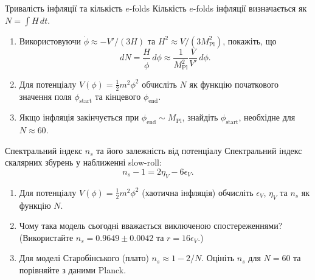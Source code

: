 \begin{problem}{Тривалість інфляції та кількість $e$-folds}
Кількість $e$-folds інфляції визначається як $N = \int H\,dt$.

\begin{enumerate}
    \item Використовуючи $\dot{\phi} \approx -V'/(3H)$ та $H^2 \approx V/(3M_{\mathrm{Pl}}^2)$,
          покажіть, що
          \[
          dN = \frac{H}{\dot{\phi}}\,d\phi \approx \frac{1}{M_{\mathrm{Pl}}^2}\frac{V}{V'}\,d\phi.
          \]
    \item Для потенціалу $V(\phi) = \frac{1}{2}m^2\phi^2$ обчисліть $N$ як функцію
          початкового значення поля $\phi_{\text{start}}$ та кінцевого $\phi_{\text{end}}$.
    \item Якщо інфляція закінчується при $\phi_{\text{end}} \sim M_{\mathrm{Pl}}$,
          знайдіть $\phi_{\text{start}}$, необхідне для $N \approx 60$.
\end{enumerate}
\end{problem}


\begin{problem}{Спектральний індекс $n_s$ та його залежність від потенціалу}
Спектральний індекс скалярних збурень у наближенні slow-roll:
\[
n_s - 1 = 2\eta_V - 6\epsilon_V.
\]

\begin{enumerate}
    \item Для потенціалу $V(\phi) = \frac{1}{2}m^2\phi^2$ (хаотична інфляція)
          обчисліть $\epsilon_V$, $\eta_V$ та $n_s$ як функцію $N$.
    \item Чому така модель сьогодні вважається виключеною спостереженнями?
          (Використайте $n_s = 0.9649 \pm 0.0042$ та $r = 16\epsilon_V$.)
    \item Для моделі Старобінського (плато) $n_s \approx 1 - 2/N$.
          Оцініть $n_s$ для $N = 60$ та порівняйте з даними Planck.
\end{enumerate}
\end{problem}



